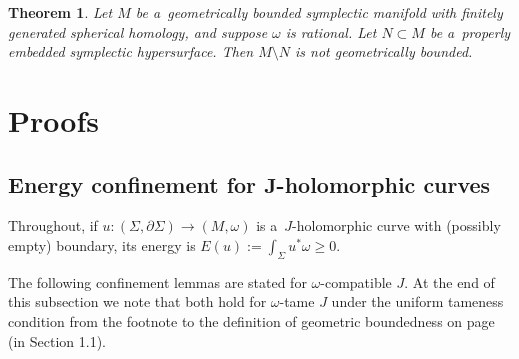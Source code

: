 \documentclass[10pt,a4paper]{amsart}
\numberwithin{equation}{section}
\newtheorem{tm}[Theorem]{Theorem}
\theoremstyle{definition}
\begin{document}
\begin{tm}\label{tm:1}
Let $M$ be a~geometrically bounded symplectic manifold with finitely generated spherical homology, and suppose $\omega$ is rational.
Let $N\subset M$ be a~properly embedded symplectic hypersurface.
Then $M\setminus N$ is not geometrically bounded.
\end{tm}

\section{Proofs}\label{sec:proofs}

\subsection[Energy confinement for J-holomorphic curves]{Energy confinement for $\boldsymbol{J}$-holomorphic curves}
Throughout, if $u\colon (\Sigma,\partial\Sigma)\to (M,\omega)$ is a~$J$-holomorphic curve with (possibly empty) boundary, its energy is
$
E(u):=\int_{\Sigma} u^{*}\omega \ge 0$.


The following confinement lemmas are stated for $\omega$-compatible $J$. At the end of this subsection we note that both hold for $\omega$-tame $J$ under the uniform tameness condition from the footnote to the definition of geometric boundedness on page \pageref{tm:1} (in Section 1.1).
\end{document}
